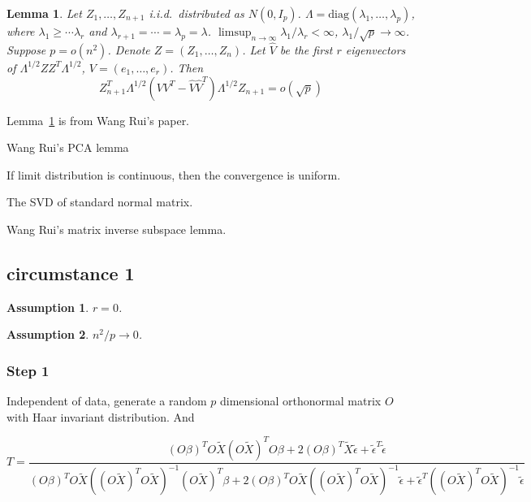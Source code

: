 \documentclass[review]{elsarticle}
\theoremstyle{plain}
\newtheorem{lemma}{Lemma}
\newtheorem{assumption}{\quad\quad Assumption}
\theoremstyle{definition}
\theoremstyle{remark}
\begin{document}
\begin{lemma}\label{wangPCA}
    Let $Z_1,\ldots,Z_{n+1}$ i.i.d.\ distributed as $N(0,I_p)$.
    $\Lambda=\textrm{diag}(\lambda_1,\ldots,\lambda_p)$, where $\lambda_1\geq \cdots \lambda_r$ and $\lambda_{r+1}=\cdots =\lambda_p=\lambda$.
    $\limsup_{n\to \infty} \lambda_1/\lambda_r<\infty$, $\lambda_1/\sqrt{p}\to \infty$.
    Suppose $p=o(n^2)$.
    Denote $Z=(Z_1,\ldots,Z_n)$. Let $\hat{V}$ be the first $r$ eigenvectors of $\Lambda^{1/2}Z Z^T\Lambda^{1/2}$, $V=(e_1,\ldots,e_r)$. Then
    \begin{equation}
        Z_{n+1}^T \Lambda^{1/2}(VV^T -\hat{V}\hat{V}^T)\Lambda^{1/2}Z_{n+1}=o(\sqrt{p})
    \end{equation}
\end{lemma}
Lemma~\ref{wangPCA} is from Wang Rui's paper.

Wang Rui's PCA lemma

If limit distribution is continuous, then the convergence is uniform.

The SVD of standard normal matrix.

Wang Rui's matrix inverse subspace lemma.

\subsection{circumstance 1}
\begin{assumption}
    $r=0$.
\end{assumption}
\begin{assumption}
    $n^2/p\to 0$.
\end{assumption}

\subsubsection{Step 1}
Independent of data, generate a random $p$ dimensional orthonormal matrix $O$ with Haar invariant distribution. And 

\begin{equation}
    T=\frac{{(O\beta)}^T O\tilde{X}{(O\tilde{X})}^T O\beta+
        2{(O\beta)}^T \tilde{X}\tilde{\epsilon}+
        \tilde{\epsilon}^T\tilde{\epsilon}
    }{{(O\beta)}^T O\tilde{X}{({(O\tilde{X})}^T O\tilde{X})}^{-1}{(O\tilde{X})}^T \beta+
        2{(O\beta)}^T O\tilde{X}{({(O\tilde{X})}^T O\tilde{X})}^{-1}\tilde{\epsilon}+
        \tilde{\epsilon}^T{({(O\tilde{X})}^T O\tilde{X})}^{-1}\tilde{\epsilon}
    }
\end{equation}
\end{document}
